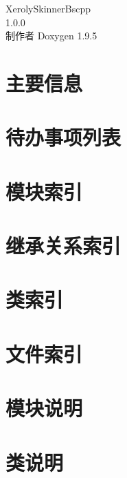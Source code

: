 \documentclass[twoside]{book}
\newcommand{\+}{\discretionary{\mbox{\scriptsize$\hookleftarrow$}}{}{}}
\newcommand{\clearemptydoublepage}{%
    \newpage{\pagestyle{empty}\cleardoublepage}%
  }
\begin{document}
  \raggedbottom
  \begin{CJK}{UTF8}{gbsn}
    \hypersetup{pageanchor=false,
                bookmarksnumbered=true,
                pdfencoding=unicode
               }
  \begin{titlepage}
  \vspace*{7cm}
  \begin{center}%
  {\Large Xeroly\+Skinner\+Bscpp}\\
  [1ex]\large 1.\+0.\+0 \\
  \vspace*{1cm}
  {\large 制作者 Doxygen 1.9.5}\\
  \end{center}
  \end{titlepage}
  \clearemptydoublepage
  \tableofcontents
  \clearemptydoublepage
  \hypersetup{pageanchor=true}
\chapter{主要信息}
\label{index}\hypertarget{index}{}
\chapter{待办事项列表}
\label{todo}

\chapter{模块索引}

\chapter{继承关系索引}

\chapter{类索引}

\chapter{文件索引}

\chapter{模块说明}

\chapter{类说明}


















\end{CJK}
\end{document}

